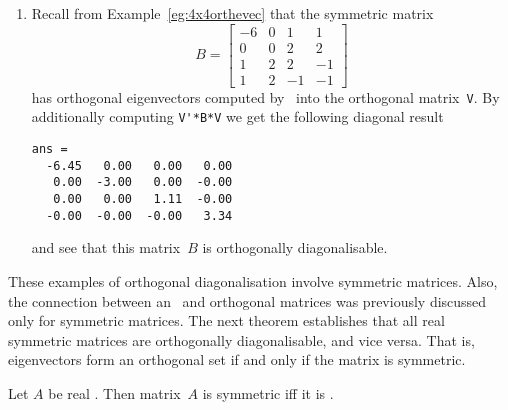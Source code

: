 \begin{example}
\begin{enumerate}
\item Recall from Example~\ref{eg:4x4orthevec} that the symmetric matrix
\begin{equation*}
B=\begin{bmatrix} -6 & 0 & 1 & 1
\\ 0 & 0 & 2 & 2
\\ 1 & 2 & 2 & -1
\\ 1 & 2 & -1 & -1 \end{bmatrix}
\end{equation*}
has orthogonal eigenvectors computed by \script\ into the orthogonal matrix~\verb|V|.
By additionally computing \verb|V'*B*V| we get the following diagonal result \twodp
\setbox\ajrqrbox\hbox{}%
\marginpar{\usebox{\ajrqrbox}}%
\begin{verbatim}
ans =
  -6.45   0.00   0.00   0.00
   0.00  -3.00   0.00  -0.00
   0.00   0.00   1.11  -0.00
  -0.00  -0.00  -0.00   3.34
\end{verbatim}
and see that this matrix~\(B\) is orthogonally diagonalisable.
\end{enumerate}
\end{example}



These examples of orthogonal diagonalisation involve symmetric matrices.
Also, the connection between an \svd\ and orthogonal matrices was previously discussed only for symmetric matrices. 
The next theorem establishes that all real symmetric matrices are orthogonally diagonalisable, and vice versa.
That is, eigenvectors form an orthogonal set if and only if the matrix is symmetric.
 

\begin{theorem}[spectral] \label{thm:symspec} 
Let \(A\) be real .  
Then matrix~\(A\) is symmetric iff it is .
\end{theorem}

